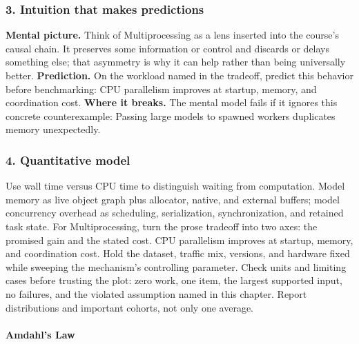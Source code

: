 \subsubsection*{3. Intuition that makes predictions}
\textbf{Mental picture.} Think of Multiprocessing as a lens inserted into the course's causal chain. It preserves some information or control and discards or delays something else; that asymmetry is why it can help rather than being universally better.
\textbf{Prediction.} On the workload named in the tradeoff, predict this behavior before benchmarking: CPU parallelism improves at startup, memory, and coordination cost.
\textbf{Where it breaks.} The mental model fails if it ignores this concrete counterexample: Passing large models to spawned workers duplicates memory unexpectedly.
\subsubsection*{4. Quantitative model}
Use wall time versus CPU time to distinguish waiting from computation. Model memory as live object graph plus allocator, native, and external buffers; model concurrency overhead as scheduling, serialization, synchronization, and retained task state.
For Multiprocessing, turn the prose tradeoff into two axes: the promised gain and the stated cost. CPU parallelism improves at startup, memory, and coordination cost. Hold the dataset, traffic mix, versions, and hardware fixed while sweeping the mechanism's controlling parameter.
Check units and limiting cases before trusting the plot: zero work, one item, the largest supported input, no failures, and the violated assumption named in this chapter. Report distributions and important cohorts, not only one average.
\paragraph{Amdahl's Law}
